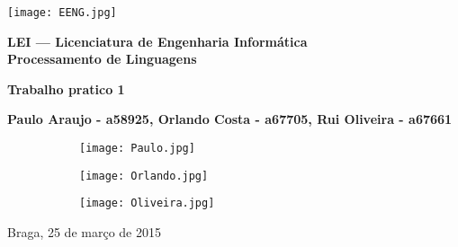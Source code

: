 \begin{titlepage}
\begin{center}

\begin{flushleft}
\texttt{[image: EENG.jpg]}\\
\end{flushleft}

\vspace{1.5cm}

\Large{\textbf{LEI --- Licenciatura de Engenharia Informática}}\\
\vspace{1cm}
\Large{\textbf{Processamento de Linguagens}}\\

\vspace{1cm}

\Huge{\textbf{Trabalho pratico 1}} \\

\vspace{2cm}

\Large{\textbf{Paulo Araujo - a58925, Orlando Costa -  a67705, Rui Oliveira - a67661}}\\
\begin{figure}[h]
\centering
\begin{subfigure}{.3\textwidth}
  \centering
  \texttt{[image: Paulo.jpg]}
\end{subfigure}
\begin{subfigure}{.3\textwidth}
  \centering
  \texttt{[image: Orlando.jpg]}
\end{subfigure}
\begin{subfigure}{.3\textwidth}
  \centering
  \texttt{[image: Oliveira.jpg]}
\end{subfigure}
\end{figure}

\vspace{1.5cm}
Braga, 25 de março de 2015

\end{center}

\end{titlepage}
